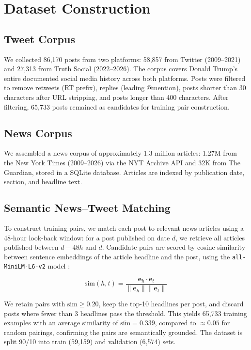 \documentclass[11pt,a4paper]{article}
\begin{document}
\section{Dataset Construction}

\subsection{Tweet Corpus}

We collected 86,170 posts from two platforms: 58,857 from Twitter (2009--2021) and 27,313 from Truth Social (2022--2026). The corpus covers Donald Trump's entire documented social media history across both platforms. Posts were filtered to remove retweets (RT prefix), replies (leading @mention), posts shorter than 30 characters after URL stripping, and posts longer than 400 characters. After filtering, 65,733 posts remained as candidates for training pair construction.

\subsection{News Corpus}

We assembled a news corpus of approximately 1.3 million articles: 1.27M from the New York Times (2009--2026) via the NYT Archive API and 32K from The Guardian, stored in a SQLite database. Articles are indexed by publication date, section, and headline text.

\subsection{Semantic News--Tweet Matching}

To construct training pairs, we match each post to relevant news articles using a 48-hour look-back window: for a post published on date $d$, we retrieve all articles published between $d-48h$ and $d$. Candidate pairs are scored by cosine similarity between sentence embeddings \citep{reimers2019sentence} of the article headline and the post, using the \texttt{all-MiniLM-L6-v2} model \citep{wang2020minilm}:

\begin{equation}
    \text{sim}(h, t) = \frac{\mathbf{e}_h \cdot \mathbf{e}_t}{\|\mathbf{e}_h\| \|\mathbf{e}_t\|}
\end{equation}

We retain pairs with $\text{sim} \geq 0.20$, keep the top-10 headlines per post, and discard posts where fewer than 3 headlines pass the threshold. This yields 65,733 training examples with an average similarity of $\overline{\text{sim}} = 0.339$, compared to $\approx 0.05$ for random pairings, confirming the pairs are semantically grounded. The dataset is split 90/10 into train (59,159) and validation (6,574) sets.
\end{document}
